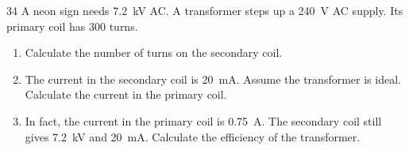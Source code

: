 \begin{practiceq}{3}{4}\label{pq:neon}
A neon sign needs \qty{7.2}{kV} AC. A transformer steps up a \qty{240}{V} AC supply. Its
primary coil has 300 turns.
\begin{enumerate}[label=(\alph*)]
  \item Calculate the number of turns on the secondary coil. 
  \item The current in the secondary coil is \qty{20}{mA}. Assume the transformer is ideal.
        Calculate the current in the primary coil. 
  \item In fact, the current in the primary coil is \qty{0.75}{A}. The secondary coil still
        gives \qty{7.2}{kV} and \qty{20}{mA}. Calculate the efficiency of the transformer.
\end{enumerate}
\end{practiceq}

